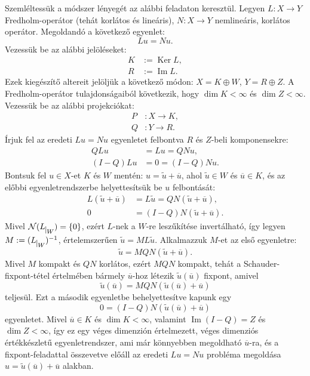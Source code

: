 \documentclass[oneside, titlepage, 12pt, a4paper]{report}
\DeclareMathOperator{\Ima}{Im}	%
\DeclareMathOperator{\Ker}{Ker}	%
\begin{document}
Szemléltessük a módszer lényegét az alábbi feladaton keresztül. Legyen $L : X \rightarrow Y$ Fredholm-operátor (tehát korlátos és lineáris), $N : X \rightarrow Y$ nemlineáris, korlátos operátor.
Megoldandó a következő egyenlet:
\begin{equation*}
Lu = Nu.
\end{equation*}
Vezessük be az alábbi jelöléseket:
\begin{align*}
K &:= \Ker L, \\
R &:= \Ima L.
\end{align*}
Ezek kiegészítő altereit jelöljük a következő módon: $X = K \oplus W$, $Y = R \oplus Z$. A Fredholm-operátor tulajdonságaiból következik, hogy $\dim K < \infty$ és $\dim Z < \infty$. Vezessük be az alábbi projekciókat:
\begin{align*}
P &: X \rightarrow K, \\
Q &: Y \rightarrow R.
\end{align*}
Írjuk fel az eredeti $Lu = Nu$ egyenletet felbontva $R$ és $Z$-beli komponensekre:
\begin{align*}
Q L u &= L u = Q N u, \\
(I - Q) L u &= 0 = (I - Q) N u.
\end{align*}
Bontsuk fel $u \in X$-et $K$ és $W$ mentén: $u = \widetilde{u} + \overline{u}$, ahol $\widetilde{u} \in W$ és $\overline{u} \in K$, és az előbbi egyenletrendszerbe helyettesítsük be $u$ felbontását:
\begin{align*}
L (\widetilde{u} + \overline{u}) &= L \widetilde{u} = Q N (\widetilde{u} + \overline{u}), \\
0 &= (I - Q) N (\widetilde{u} + \overline{u}).
\end{align*}
Mivel $\mathcal{N}( L_{\mkern 1mu \vrule height 2ex\mkern2mu W}) = \{ 0 \}$, ezért $L$-nek a $W$-re leszűkítése invertálható, így legyen $M := (L_{\mkern 1mu \vrule height 2ex\mkern2mu W})^{-1}$, értelemszerűen $\widetilde{u} = M L \widetilde{u}$. Alkalmazzuk $M$-et az első egyenletre:
\begin{equation*}
\widetilde{u} = M Q N (\widetilde{u} + \overline{u}).
\end{equation*}
Mivel $M$ kompakt és $QN$ korlátos, ezért $MQN$ kompakt, tehát a Schauder-fixpont-tétel értelmében bármely $\overline{u}$-hoz létezik $\widetilde{u}(\overline{u})$ fixpont, amivel
\begin{equation*}
\widetilde{u}(\overline{u}) = M Q N (\widetilde{u}(\overline{u}) + \overline{u})
\end{equation*}
teljesül. Ezt a második egyenletbe behelyettesítve kapunk egy
\begin{equation*}
0 = (I - Q) N (\widetilde{u}(\overline{u}) + \overline{u})
\end{equation*}
egyenletet. Mivel $\overline{u} \in K$ és $\dim K < \infty$, valamint $\Ima (I - Q) = Z$ és $\dim Z < \infty$, így ez egy véges dimenzión értelmezett, véges dimenziós értékkészletű egyenletrendszer, ami már könnyebben megoldható $\overline{u}$-ra, és a fixpont-feladattal összevetve előáll az eredeti $Lu = Nu$ probléma megoldása $u = \widetilde{u}(\overline{u}) + \overline{u}$ alakban.
\end{document}
